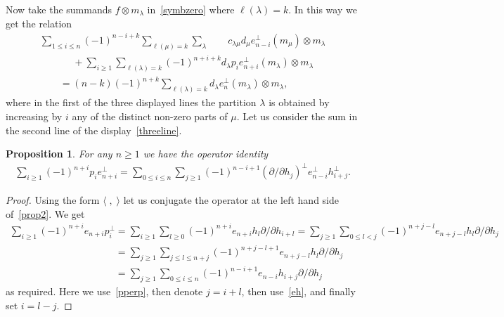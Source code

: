 \documentclass[11pt]{article}
\newtheorem{proposition}{Proposition}
\numberwithin{equation}{section}
\renewcommand\ge{\geqslant}
\renewcommand\le{\leqslant}
\begin{document}
Now take the summands $f\otimes m_\lambda$ in~\eqref{symbzero} where $\ell(\lambda)=k$.
In this way we get the relation
\begin{gather}
\sum_{1\le i\le n}(-1)^{n-i+k}\sum_{\ell(\mu)=k}\sum_\lambda
\qquad
c_{\lambda\mu}d_\mu e_{n-i}^{\perp}(m_\mu)\otimes m_\lambda
\nonumber
\\
\qquad\phantom{=}
{}+\sum_{i\ge1}\sum_{\ell(\lambda)=k}(-1)^{n+i+k}d_\lambda
p_ie_{n+i}^{\perp}(m_\lambda)\otimes m_\lambda
\nonumber
\\
\qquad{}
=(n-k)(-1)^{n+k}\sum_{\ell(\lambda)=k}d_\lambda e_n^{\perp}(m_\lambda)\otimes m_\lambda,
\label{threeline}
\end{gather}
where in the f\/irst of the three displayed lines the partition $\lambda$ is obtained by increasing by $i$
any of the distinct non-zero parts of $\mu$.
Let us consider the sum in the second line of the display~\eqref{threeline}.
\begin{proposition}\label{Prop2}
For any $n\ge1$ we have the operator identity
\begin{gather}
\label{prop2}
\sum_{i\ge1}(-1)^{n+i}p_ie_{n+i}^{\perp}
=\sum_{0\le i\le n}\sum_{j\ge1}(-1)^{n-i+1}(
\partial /\partial h_j)^{\perp}e_{n-i}
^{\perp}h_{i+j}^{\perp}.
\end{gather}
\end{proposition}
\begin{proof}
Using the form $\langle\;,\;\rangle$ let us conjugate the operator at the left hand side of~\eqref{prop2}.
We get
\begin{gather*}
\sum_{i\ge1}(-1)^{n+i}e_{n+i}p_i^{\perp}
=\sum_{i\ge1}\sum_{l\ge0}(-1)^{n+i}e_{n+i}h_{l}\partial /\partial h_{i+l}
=\sum_{j\ge1}\sum_{0\le l<j}(-1)^{n+j-l}e_{n+j-l}h_{l}\partial /\partial h_{j}
\\
\phantom{\sum_{i\ge1}(-1)^{n+i}e_{n+i}p_i^{\perp}}
=\sum_{j\ge1}\sum_{j\le l\le n+j}(-1)^{n+j-l+1}e_{n+j-l}h_{l}\partial /\partial h_{j}
\\
\phantom{\sum_{i\ge1}(-1)^{n+i}e_{n+i}p_i^{\perp}}
=\sum_{j\ge1}\sum_{0\le i\le n}(-1)^{n-i+1}e_{n-i}h_{i+j}\partial /\partial h_{j}
\end{gather*}
as required.
Here we use~\eqref{pperp}, then denote $j=i+l$, then use~\eqref{eh}, and f\/inally set
$i=l-j$.
\end{proof}
\end{document}
